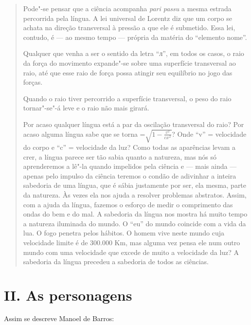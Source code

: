 \begin{quote}
Pode"-se pensar que a ciência acompanha \emph{pari passu} a mesma estrada
percorrida pela língua. A lei universal de Lorentz diz que um corpo se
achata na direção transversal à pressão a que ele é submetido. Essa lei,
contudo, é --- ao mesmo tempo --- própria da matéria do ``elemento nome''.

Qualquer que venha a ser o sentido da letra ``л'', em todos os casos, o
raio da força do movimento expande"-se sobre uma superfície transversal
ao raio, até que esse raio de força possa atingir seu equilíbrio no jogo
das forças.

Quando o raio tiver percorrido a superfície transversal, o peso do raio
tornar"-se"-á leve e o raio não mais girará.

Por acaso qualquer língua está a par da oscilação transversal do raio?
Por acaso alguma língua sabe que  se torna =$\sqrt{1-\frac{v^{2}}{cx^{2}}}$?
Onde ``v'' = velocidade do corpo e ``c'' = velocidade da luz? Como todas as
aparências levam a crer, a língua parece ser tão sabia quanto a
natureza, mas nós só aprenderemos a lê"-la quando impelidos pela ciência
e --- mais ainda --- apenas pelo impulso da ciência teremos o condão de
adivinhar a inteira sabedoria de uma língua, que é sábia justamente por
ser, ela mesma, parte da natureza. Às vezes ela nos ajuda a resolver
problemas abstratos. Assim, com a ajuda da língua, fazemos o esforço de
medir o comprimento das ondas do bem e do mal. A sabedoria da língua nos
mostra há muito tempo a natureza iluminada do mundo. O ``eu'' do mundo
coincide com a vida da lua. O fogo penetra pelos hábitos. O homem vive
neste mundo cuja velocidade limite é de 300.000 Km, mas alguma vez pensa
ele num outro mundo com uma velocidade que excede de muito a velocidade
da luz? A sabedoria da língua precedeu a sabedoria de todos as
ciências.
\end{quote}

\section{II. As personagens}

Assim se descreve Manoel de Barros:

